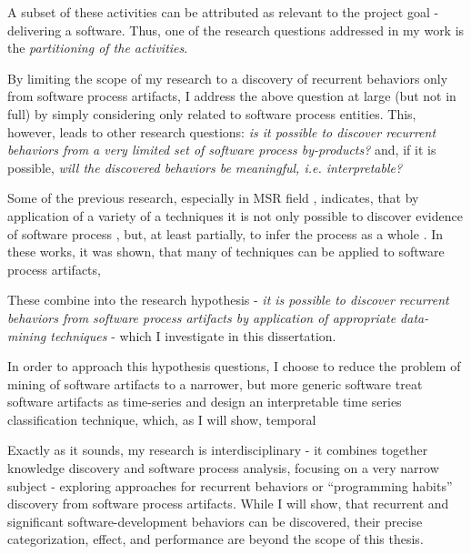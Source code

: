 A subset of these activities can be attributed as relevant to the project goal - delivering a software. 
Thus, one of the research questions addressed in my work is the \textit{partitioning of the activities}. 

By limiting the scope of my research to a discovery of recurrent behaviors only from software process 
artifacts, I address the above question at large (but not in full) by simply considering only related to software 
process entities.
This, however, leads to other research questions: 
\textit{is it possible to discover recurrent behaviors from a very limited set of software process by-products?} 
and, if it is possible, 
\textit{will the discovered behaviors be meaningful, i.e. interpretable?}

Some of the previous research, especially in MSR field  \cite{citeulike:9114115, citeulike:7853299}, 
indicates, that by application of a variety of a techniques it is not only possible to discover evidence of 
software process \cite{citeulike:9007622}, but, at least partially, to infer the process as a whole \cite{citeulike:5128808}. 
In these works, it was shown, that many of techniques can be applied to software process artifacts, 

These combine into the research hypothesis - \textit{it is possible to discover recurrent behaviors 
from software process artifacts by application of appropriate data-mining techniques} - 
which I investigate in this dissertation. 

In order to approach this hypothesis questions, I choose to reduce the problem of mining of software artifacts to a narrower,
but more generic software treat software artifacts as time-series and design an interpretable time 
series classification technique, which, 
as I will show, temporal 


Exactly as it sounds, my research is interdisciplinary - it combines together knowledge discovery and software process 
analysis, focusing on a very narrow subject - exploring approaches for recurrent behaviors or ``programming habits'' 
discovery from software process artifacts.
While I will show, that recurrent and significant software-development behaviors can be discovered,
their precise categorization, effect, and performance are beyond the scope of this thesis.

